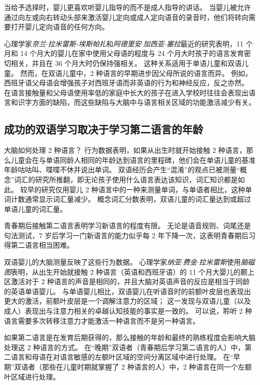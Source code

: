 当给予选择时，婴儿更喜欢听婴儿指导的而不是成人指导的讲话。
当婴儿被允许通过向左或向右转动头部来激活婴儿定向或成人定向语音的录音时，他们将转向需要打开婴儿定向语音的任何方向。


心理学家\textit{奈兰$\cdot$拉米雷斯-埃斯帕扎}和\textit{阿德里安$\cdot$加西亚-塞拉}最近的研究表明，11 个月和 14 个月大的婴儿在家中使用父母语的程度与 24 个月大时孩子的语言发育密切相关，并且在 36 个月大时仍保持强相关。
这种关系适用于单语儿童和双语儿童。
然而，在双语儿童中，2 种语言的早期进步因父母所说的语言而异。
例如，西班牙语父母语会增强孩子对西班牙语而非英语的行为和神经反应，反之亦然。
在语言接触量和父母语使用率低的家庭中长大的孩子在进入学校时往往会表现出语言和识字方面的缺陷，而这些缺陷与大脑中与语言相关区域的功能激活减少有关。



\subsection{成功的双语学习取决于学习第二语言的年龄}

大脑如何处理 2 种语言？
行为数据表明，如果从出生时就开始接触 2 种语言，那么儿童会在与单语同龄人相同的年龄达到语言的里程碑，他们会在单语儿童的基准年龄咕咕叫、喋喋不休并说出单词。
双语经历会产生“混淆”的观点已被测量“概念”词汇的研究所推翻，即无论孩子使用什么语言表达该知识，词汇知识都是如此。
较早的研究仅用婴儿 2 种语言中的一种来测量单词，与单语者相比，这种单词计数通常显示词汇量减少。
概念词汇分数表明，双语儿童的词汇量达到或超过单语儿童的词汇量。


青春期后接触第二语言表明学习新语言的程度有限。
无论是语音规则、词尾还是句法测试，7 岁后学习一门新语言的能力似乎每 2 年下降一次，这表明青春期后习得第二语言相当困难。


双语婴儿的大脑测量反映了这些行为数据。
心理学家\textit{纳亚$\cdot$费金$\cdot$拉米雷斯}使用\textit{脑磁图}表明，从出生开始就接触 2 种语言（英语和西班牙语）的 11 个月大婴儿的颞上区激活对于 2 种语言的声音是相同的，并且大脑对英语声音的反应是相当于同龄的英语单语婴儿。
与单语婴儿相比，双语婴儿在听语音时的前额叶皮层也表现出更大的激活，前额叶皮层是一个调解注意力的区域；
这一发现与双语儿童（以及成人）表现出与注意力相关的卓越认知技能的事实是一致的。
可以说，聆听 2 种语言需要多次转移注意力才能激活一种语言而不是另一种语言。


如果第二语言是在发育后期获得的，那么接触的年龄和最终的熟练程度会影响大脑处理这 2 种语言的方式。
在“晚期”双语者（青春期后学习第二语言的人）中，第二语言和母语在对语言敏感的左额叶区域的空间分离区域中进行处理。
在“早期”双语者（那些在儿童时期就掌握了 2 种语言的人）中，2 种语言在同一个左额叶区域进行处理。



